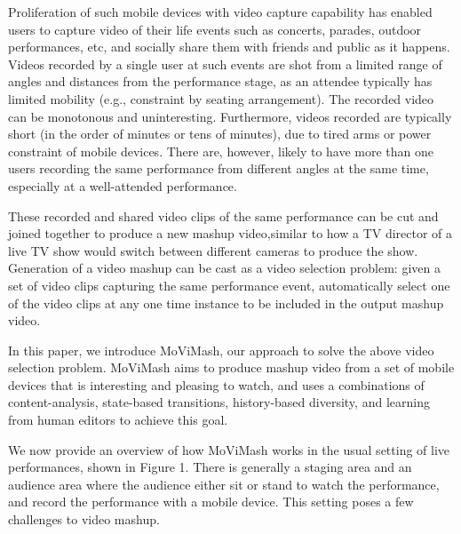 \documentclass{sig-alternate}
\begin{document}
 Proliferation of such mobile devices with video capture capability has enabled users to capture video of their life events such as concerts, parades, outdoor performances, etc, and socially share them with friends and public as it happens. Videos recorded by a single user at such events are shot from a limited range of angles and distances from the performance stage, as an attendee typically has limited mobility (e.g., constraint by seating arrangement).
The recorded video can be monotonous and uninteresting. Furthermore, videos recorded are typically short (in the order of minutes or tens of minutes), due to tired arms or power constraint of mobile devices. There are, however, likely to have more than one users recording the same performance from different angles at the same time, especially at a well-attended performance.

These recorded and shared video clips of the same performance can be cut and joined together to produce a new mashup video,similar to how a TV director of a live TV show would switch between different cameras to produce the show. Generation of a video mashup can be cast as a video selection problem: given a set of video clips capturing the same performance event, automatically select one of the video clips at any one time instance to be included
in the output mashup video.

In this paper, we introduce MoViMash, our approach to solve the above video selection problem. MoViMash aims to produce mashup video from a set of mobile devices that is interesting and pleasing to watch, and uses a combinations of content-analysis, state-based transitions, history-based diversity, and learning from human editors to achieve this goal.

We now provide an overview of how MoViMash works in the usual setting of live performances, shown in Figure 1. There is generally a staging area and an audience area where the audience either sit or stand to watch the performance, and record the performance with a mobile device. This setting poses a few challenges to video mashup.
\end{document}
